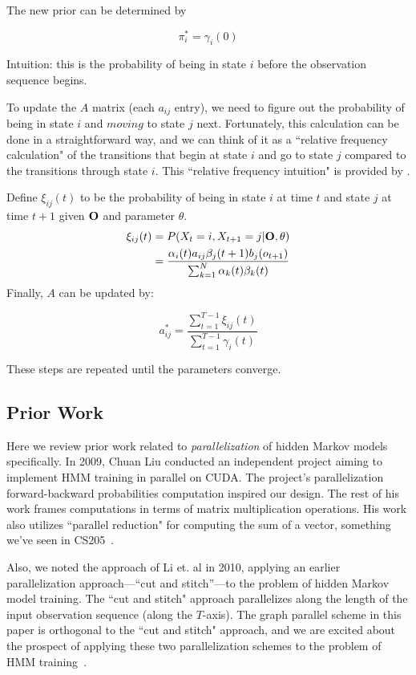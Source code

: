 The new prior can be determined by

\begin{equation}\label{pi}
\pi_i^* = \gamma_i(0)
\end{equation}

Intuition: this is the probability of being in state $i$ before the observation sequence begins.  

To update the $A$ matrix (each $a_{ij}$ entry), we need to figure  out the probability of being in state $i$ and $\textit{moving}$ to state $j$ next.  Fortunately, this calculation can be done in a straightforward way, and we can think of it as a ``relative frequency calculation" of the transitions that begin at state $i$ and go to state $j$ compared to the transitions through state $i$.  This ``relative frequency intuition" is provided by \cite{rabiner1986introduction}.

Define $\xi_{ij}(t)$ to be the probability of being in state $i$ at time $t$ and state $j$ at time $t+1$ given $\bold{O}$ and parameter $\theta$. 
\begin{equation}\label{xi}
\begin{aligned}
\xi_{ij}(t) &= P(X_t = i, X_{t+1} = j | \bold{O}, \theta)  \\
&=\frac{\alpha_i(t) a_{ij} \beta_j(t+1)b_{j}(o_{t+1})}{\sum_{k=1}^N \alpha_k(t) \beta_k(t)}
\end{aligned}
\end{equation}
Finally, $A$ can be updated by: 

\begin{equation}\label{a}
a^*_{ij} = \frac{\sum_{t=1}^{T-1}\xi_{ij}(t)}{\sum_{t=1}^{T-1}\gamma_i(t)}
\end{equation}

These steps are repeated until the parameters converge. 

\subsection{Prior Work}

Here we review prior work related to \textit{parallelization} of hidden Markov
models specifically.  In 2009, Chuan Liu conducted an independent project aiming
to implement HMM training in parallel on CUDA.  The project's parallelization
forward-backward probabilities computation inspired our design.  The rest of his
work frames computations in terms of matrix multiplication operations.  His work
also utilizes ``parallel reduction" for computing the sum of a vector, something
we've seen in CS205~\cite{cuda-hmm}.

Also, we noted the approach of Li et. al in 2010, applying an earlier
parallelization approach---``cut and stitch''---to the problem of hidden Markov
model training.  The ``cut and stitch" approach parallelizes along the length of
the input observation sequence (along the $T$-axis).  The graph parallel scheme
in this paper is orthogonal to the ``cut and stitch" approach, and we are
excited about the prospect of applying these two parallelization schemes to the
problem of HMM training~\cite{cut-stitch}.
